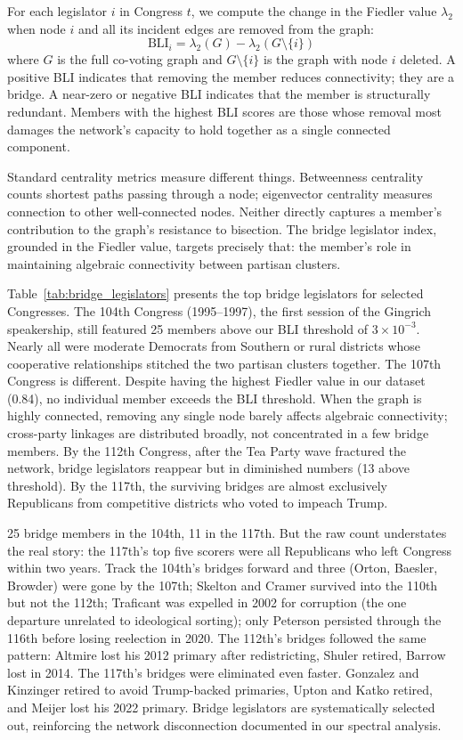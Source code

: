 \documentclass[12pt, a4paper]{article}
\begin{document}
For each legislator $i$ in Congress $t$, we compute the change in the Fiedler value $\lambda_2$ when node $i$ and all its incident edges are removed from the graph:
\begin{equation}
    \text{BLI}_i = \lambda_2(G) - \lambda_2(G \setminus \{i\})
\end{equation}
where $G$ is the full co-voting graph and $G \setminus \{i\}$ is the graph with node $i$ deleted. A positive BLI indicates that removing the member reduces connectivity; they are a bridge. A near-zero or negative BLI indicates that the member is structurally redundant. Members with the highest BLI scores are those whose removal most damages the network's capacity to hold together as a single connected component.

Standard centrality metrics measure different things. Betweenness centrality counts shortest paths passing through a node; eigenvector centrality measures connection to other well-connected nodes. Neither directly captures a member's contribution to the graph's resistance to bisection. The bridge legislator index, grounded in the Fiedler value, targets precisely that: the member's role in maintaining algebraic connectivity between partisan clusters.

Table~\ref{tab:bridge_legislators} presents the top bridge legislators for selected Congresses. The 104th Congress (1995--1997), the first session of the Gingrich speakership, still featured 25 members above our BLI threshold of $3 \times 10^{-3}$. Nearly all were moderate Democrats from Southern or rural districts whose cooperative relationships stitched the two partisan clusters together. The 107th Congress is different. Despite having the highest Fiedler value in our dataset (0.84), no individual member exceeds the BLI threshold. When the graph is highly connected, removing any single node barely affects algebraic connectivity; cross-party linkages are distributed broadly, not concentrated in a few bridge members. By the 112th Congress, after the Tea Party wave fractured the network, bridge legislators reappear but in diminished numbers (13 above threshold). By the 117th, the surviving bridges are almost exclusively Republicans from competitive districts who voted to impeach Trump.

25 bridge members in the 104th, 11 in the 117th. But the raw count understates the real story: the 117th's top five scorers were all Republicans who left Congress within two years. Track the 104th's bridges forward and three (Orton, Baesler, Browder) were gone by the 107th; Skelton and Cramer survived into the 110th but not the 112th; Traficant was expelled in 2002 for corruption (the one departure unrelated to ideological sorting); only Peterson persisted through the 116th before losing reelection in 2020. The 112th's bridges followed the same pattern: Altmire lost his 2012 primary after redistricting, Shuler retired, Barrow lost in 2014. The 117th's bridges were eliminated even faster. Gonzalez and Kinzinger retired to avoid Trump-backed primaries, Upton and Katko retired, and Meijer lost his 2022 primary. Bridge legislators are systematically selected out, reinforcing the network disconnection documented in our spectral analysis.
\end{document}

